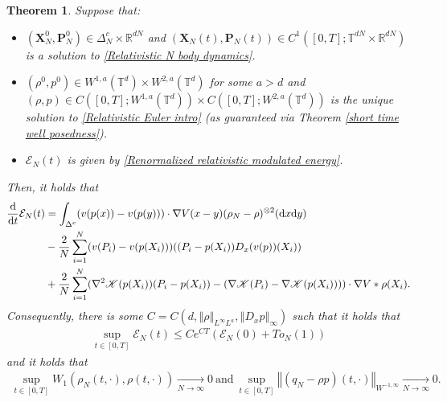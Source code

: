 \documentclass[11pt,reqno]{amsart}
\newtheorem{thm}{Theorem}[section]
\numberwithin{equation}{section}
\def\dd{{\rm d}}
\begin{document}
\begin{thm}
Suppose that: 
\begin{itemize}
    \item $(\mathbf{X}_{N}^{0},\mathbf{P}_{N}^{0})\in \Delta_{N}^{c}\times \mathbb{R}^{dN}$  and $(\mathbf{X}_{N}(t),\mathbf{P}_{N}(t))\in C^{1}([0,T];\mathbb{T}^{dN}\times \mathbb{R}^{dN})$ is a solution to \eqref{Relativistic N body dynamics}. 
    \item $(\rho^{0},p^{0})\in W^{1,a}(\mathbb{T}^{d})\times W^{2,a}(\mathbb{T}^{d})$ for some $a>d$ and $(\rho,p)\in C([0,T];W^{1,a}(\mathbb{T}^{d}))\times C([0,T];W^{2,a}(\mathbb{T}^{d}))$ is the unique solution to \eqref{Relativistic Euler intro} (as guaranteed via Theorem \ref{short time well posedness}).
    \item $\mathcal{E}_{N}(t)$ is given by \eqref{Renormalized relativistic modulated energy}.
\end{itemize}
Then, it holds that 
\begin{align}
\frac{\dd}{\dd t}\mathcal{E}_{N}(t)&= \int_{\Delta^{c}}(v(p(x))-v(p(y)))\cdot \nabla V(x-y)(\rho_{N}-\rho)^{\otimes 2}(\dd x\dd y) \notag\\
&-\frac{2}{N}\sum_{i=1}^{N}(v(P_{i})-v(p(X_{i})))((P_{i}-p(X_{i}))D_{x}(v(p))(X_{i})) \notag\\
&+\frac{2}{N}\sum_{i=1}^{N}(\nabla^{2}\mathscr{K}(p(X_{i}))(P_{i}-p(X_{i}))-(\nabla \mathscr{K}(P_{i})-\nabla \mathscr{K}(p(X_{i}))))\cdot \nabla V\ast \rho(X_{i}). \label{time der of renormalized relativistic modulated energy intro}    
\end{align}
Consequently, there is some $C=C(d,\left\Vert \rho\right\Vert_{L^{\infty}L^{a}}, \left\Vert D_{x}p\right\Vert_{\infty} )$ such that it holds that  
\begin{align}
\underset{t\in [0,T]}{\sup}\mathcal{E}_{N}(t)\leq Ce^{CT}(\mathcal{E}_{N}(0)+To_{N}(1)) \label{Gronwall est statement}     
\end{align}
and it holds that 
\begin{align}
\underset{t\in [0,T]}{\sup} W_{1}(\rho_{N}(t,\cdot ),\rho(t,\cdot))\underset{N\rightarrow \infty}{\rightarrow} 0\ \mbox{and}\ \underset{t\in [0,T]}{\sup}\left\Vert (q_{N}-\rho p)(t,\cdot)\right\Vert_{W^{-1,\infty}}\underset{N\rightarrow \infty}{\rightarrow}0. \label{convergence as N     infty statement}    
\end{align} 
\label{main thm}
\end{thm}
\end{document}
